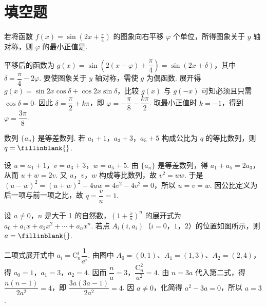 \section{填空题}

\begin{problem}
若将函数 \( f(x) = \sin \left(2x + \frac{\pi}{4}\right) \) 的图象向右平移 \( \varphi \) 个单位，所得图象关于 \( y \) 轴对称，则 \( \varphi \) 的最小正值是\fillinblank{}.

\begin{solution}
平移后的函数为 \(g(x)=\sin\left(2(x-\varphi)+\dfrac{\pi}{4}\right)=\sin(2x+\delta)\)，其中 \(\delta=\dfrac{\pi}{4}-2\varphi\). 要使图象关于 \(y\) 轴对称，需使 \(g\) 为偶函数. 展开得 \(g(x)=\sin2x\cos\delta+\cos2x\sin\delta\)，比较 \(g(x)\) 与 \(g(-x)\) 可知必须且只需 \(\cos\delta=0\). 因此 \(\delta=\dfrac{\pi}{2}+k\pi\)，即 \(\varphi=-\dfrac{\pi}{8}-\dfrac{k\pi}{2}\). 取最小正值时 \(k=-1\)，得到 \(\varphi=\dfrac{3\pi}{8}\).
\end{solution}
\end{problem}

\begin{problem}
数列 \( \{a_{n}\} \) 是等差数列. 若 \(a_{1} + 1\)，\(a_{3} + 3\)，\(a_{5} + 5\) 构成公比为 \( q \) 的等比数列，则 \( q =\fillinblank{} \).

\begin{solution}
设 \(u=a_{1}+1\)，\(v=a_{3}+3\)，\(w=a_{5}+5\). 由 \(\{a_n\}\) 是等差数列，得 \(a_{1}+a_{5}=2a_{3}\)，从而 \(u+w=2v\). 又 \(u\)，\(v\)，\(w\) 构成等比数列，故 \(v^{2}=uw\). 于是 \((u-w)^{2}=(u+w)^{2}-4uw=4v^{2}-4v^{2}=0\)，所以 \(u=v=w\). 因公比定义为后一项与前一项之比，故 \(q=\dfrac vu=1\).
\end{solution}
\end{problem}

\begin{problem}
设 \(a \neq 0\)，\(n\) 是大于 1 的自然数，\(\left(1 + \frac{x}{a}\right)^n\) 的展开式为 \(a_0 + a_1x + a_2x^2 + \cdots + a_nx^n\). 若点 \(A_i(i, a_i)\)（\(i = 0\)，\(1\)，\(2\)）的位置如图所示，则 \(a =\fillinblank{}\).


\begin{solution}
二项式展开式中 \(a_i=\mathrm C_n^i\dfrac{1}{a^i}\). 由图中 \(A_0=(0,1)\)、\(A_1=(1,3)\)、\(A_2=(2,4)\)，得 \(a_0=1\)，\(a_1=3\)，\(a_2=4\). 因而 \(\dfrac na=3\)，\(\dfrac{\mathrm C_n^2}{a^2}=4\). 由 \(n=3a\) 代入第二式，得 \(\dfrac{n(n-1)}{2a^2}=4\)，即 \(\dfrac{3a(3a-1)}{2a^2}=4\). 因 \(a\neq0\)，化简得 \(a^2-3a=0\)，所以 \(a=3\).
\end{solution}
\end{problem}

